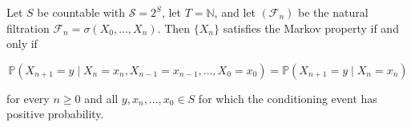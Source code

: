 	\begin{theorem}
		\label{thm:markov-property-on-a-countable-state-space}
		Let $S$ be countable with $\mathcal{S} = 2^S$, let $T = \mathbb{N}$, and let $(\mathcal{F}_n)$ be the natural filtration $\mathcal{F}_n = \sigma(X_0, \ldots, X_n)$. Then $\{X_n\}$ satisfies the Markov property if and only if

			\begin{equation}
				\mathbb{P}(X_{n+1} = y \mid X_n = x_n, X_{n-1} = x_{n-1}, \ldots, X_0 = x_0) = \mathbb{P}(X_{n+1} = y \mid X_n = x_n)
			\end{equation}

		for every $n \geq 0$ and all $y, x_n, \ldots, x_0 \in S$ for which the conditioning event has positive probability.
	\end{theorem}
